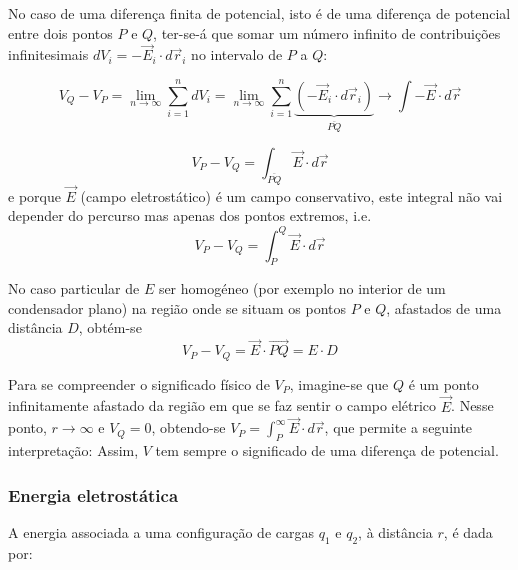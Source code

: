 \documentclass[12pt,a4paper,oneside]{paper}
\begin{document}
No caso de uma diferença finita de potencial, isto é de uma diferença de potencial entre dois pontos $P$ e $Q$, ter-se-á
que somar um número infinito de contribuições infinitesimais $dV_i=- \vec{E}_i \cdot d\vec{r}_i$ no intervalo de $P$ a $Q$:

\begin{equation}
V_Q-V_P  = \lim_{n  \to \infty } \sum_{i=1}^n dV_i = \lim_{n \to \infty } \sum_{i=1}^n \underbrace{( - \vec{E}_i \cdot d\vec{r}_i )}_{\overline{PQ}} \rightarrow \int - \vec{E} \cdot d\vec{r}
\end{equation}

\begin{equation*} 
V_P - V_Q  = \int_{\overline{PQ}}  \vec{E} \cdot d \vec{r}
\end{equation*}
e porque $\vec{E}$ (campo eletrostático) é um campo conservativo, este integral não vai depender do percurso mas apenas
dos pontos extremos, i.e.
\begin{equation*} 
V_P - V_Q  = \int_P^Q  \vec{E} \cdot d\vec{r}
\end{equation*}


No caso particular de $E$ ser homogéneo (por exemplo no interior de um condensador plano)  na região onde se situam os
pontos $P$ e $Q$, afastados de uma distância $D$, obtém-se 
\begin{equation}\label{eq:difPot}
V_P - V_Q  =  \vec{E}\cdot\vec{PQ}=E\cdot D
\end{equation}

Para se compreender o significado físico de $V_P$, imagine-se que $Q$ é um ponto infinitamente
afastado da região em que se faz sentir o campo elétrico $\vec{E}$.
Nesse ponto, $r \to \infty $ e $V_Q=0$,
obtendo-se $V_P =  \int_P^\infty  \vec{E} \cdot d\vec{r}$, que permite a seguinte interpretação:
\newline
\newline
{}
\newline
\newline
Assim, $V$ tem sempre o significado de uma diferença de potencial.

\subsubsection{{Energia eletrostática}}
A energia associada a uma configuração de cargas $q_1$ e $q_2$, à distância $r$, é dada por:
\end{document}
